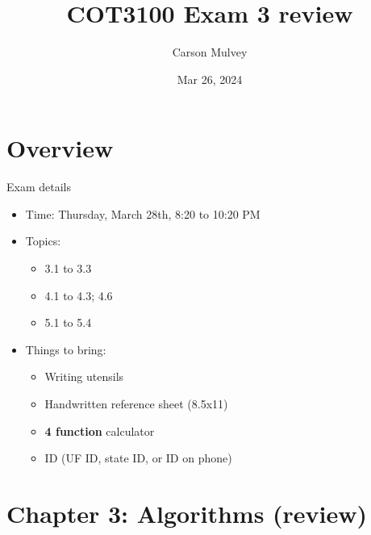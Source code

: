 \documentclass[dvipsnames,t]{beamer}
\author{Carson Mulvey}
\title{COT3100 Exam 3 review}
\date{Mar 26, 2024}
\begin{document}
\frame{\titlepage}


\section{Overview}

\begin{frame}{Exam details}
\begin{itemize}
	\item Time: Thursday, March 28th, 8:20 to 10:20 PM
	\item Topics:
	\begin{itemize}
		\item 3.1 to 3.3
		\item 4.1 to 4.3; 4.6
            \item 5.1 to 5.4
	\end{itemize}
	\item Things to bring:
	\begin{itemize}
		\item Writing utensils
		\item Handwritten reference sheet (8.5x11)
		\item \textbf{4 function} calculator
		\item ID (UF ID, state ID, or ID on phone)
	\end{itemize}
\end{itemize}
\end{frame}

\section{Chapter 3: Algorithms (review)}
\end{document}

